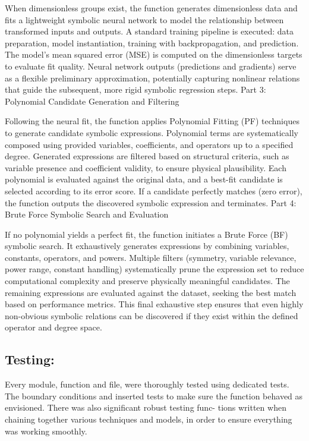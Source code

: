 \documentclass{article}
\begin{document}
When dimensionless groups exist, the function generates dimensionless data and fits a lightweight symbolic neural network to model the relationship between transformed inputs and outputs. A standard training pipeline is executed: data preparation, model instantiation, training with backpropagation, and prediction. The model’s mean squared error (MSE) is computed on the dimensionless targets to evaluate fit quality. Neural network outputs (predictions and gradients) serve as a flexible preliminary approximation, potentially capturing nonlinear relations that guide the subsequent, more rigid symbolic regression steps.
Part 3: Polynomial Candidate Generation and Filtering

Following the neural fit, the function applies Polynomial Fitting (PF) techniques to generate candidate symbolic expressions. Polynomial terms are systematically composed using provided variables, coefficients, and operators up to a specified degree. Generated expressions are filtered based on structural criteria, such as variable presence and coefficient validity, to ensure physical plausibility. Each polynomial is evaluated against the original data, and a best-fit candidate is selected according to its error score. If a candidate perfectly matches (zero error), the function outputs the discovered symbolic expression and terminates.
Part 4: Brute Force Symbolic Search and Evaluation

If no polynomial yields a perfect fit, the function initiates a Brute Force (BF) symbolic search. It exhaustively generates expressions by combining variables, constants, operators, and powers. Multiple filters (symmetry, variable relevance, power range, constant handling) systematically prune the expression set to reduce computational complexity and preserve physically meaningful candidates. The remaining expressions are evaluated against the dataset, seeking the best match based on performance metrics. This final exhaustive step ensures that even highly non-obvious symbolic relations can be discovered if they exist within the defined operator and degree space.

\subsection{Testing:}
Every module, function and file, were thoroughly tested using dedicated tests. The boundary conditions and
inserted tests to make sure the function behaved as envisioned. There was also significant robust testing func-
tions written when chaining together various techniques and models, in order to ensure everything was working
smoothly.\\
\end{document}
